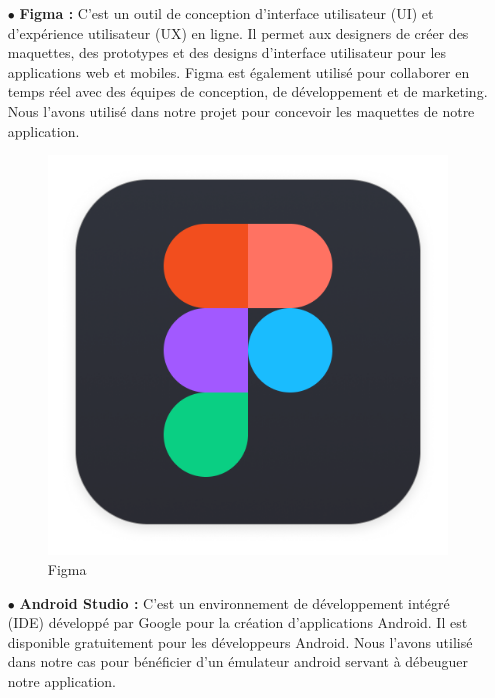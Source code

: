\begin{itemize}
        \item[$\bullet$] \textbf{ Figma  :}
             C'est un outil de conception d’interface utilisateur (UI) et d’expérience utilisateur (UX) en ligne. Il permet aux designers de créer des maquettes, des prototypes et des designs d’interface utilisateur pour les applications web et mobiles. Figma est également utilisé pour collaborer en temps réel avec des équipes de conception, de développement et de marketing. Nous l’avons utilisé dans notre projet pour concevoir les maquettes de notre application. 
              
            \begin{figure}[H]
                \centering \includegraphics[scale=0.09]{chap1.images/FigmaLogo.png}
                \caption{Figma}
                \label{Figma}
            \end{figure}

            
 \bigskip  
       \item[$\bullet$] \textbf{ Android Studio :}
            C'est un environnement de développement intégré (IDE) développé par Google pour la création d’applications Android. Il est disponible gratuitement pour les développeurs Android. Nous l’avons utilisé dans notre cas pour bénéficier d’un émulateur android servant à débeuguer notre application.
              

\end{itemize}
